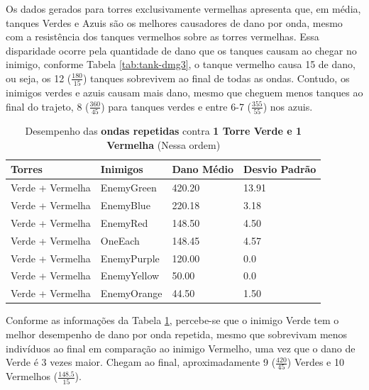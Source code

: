 Os dados gerados para torres exclusivamente vermelhas apresenta que, em média,  tanques Verdes e Azuis são os melhores causadores de dano por onda, mesmo com a resistência dos tanques vermelhos sobre as torres vermelhas. Essa disparidade ocorre pela quantidade de dano que os tanques causam ao chegar no inimigo, conforme Tabela \ref{tab:tank-dmg3}, o tanque vermelho causa 15 de dano, ou seja, os 12 ($\frac{180}{15}$) tanques sobrevivem ao final de todas as ondas. Contudo, os inimigos verdes e azuis causam mais dano, mesmo que cheguem menos tanques ao final do trajeto, 8 ($\frac{360}{45}$) para tanques verdes e entre 6-7 ($\frac{355}{55}$) nos azuis. 

\begin{table}
\caption{Desempenho das \textbf{ondas repetidas} contra \textbf{1 Torre Verde e 1 Vermelha} (Nessa ordem)}
\begin{tabular}{l|l|ll}
Torres           & Inimigos & Dano Médio & Desvio Padrão \\ \hline
Verde + Vermelha & EnemyGreen    & 420.20     & 13.91         \\
Verde + Vermelha & EnemyBlue     & 220.18     & 3.18          \\
Verde + Vermelha & EnemyRed      & 148.50     & 4.50          \\
Verde + Vermelha & OneEach       & 148.45     & 4.57          \\
Verde + Vermelha & EnemyPurple   & 120.00     & 0.0           \\
Verde + Vermelha & EnemyYellow   & 50.00      & 0.0           \\
Verde + Vermelha & EnemyOrange   & 44.50      & 1.50          
\end{tabular}
\label{tab:greenred}
\end{table}

\pagebreak

Conforme as informações da Tabela \ref{tab:greenred}, percebe-se que o inimigo Verde tem o melhor desempenho de dano por onda repetida, mesmo que sobrevivam menos indivíduos ao final em comparação ao inimigo Vermelho, uma vez que o dano de Verde é 3 vezes maior. Chegam ao final, aproximadamente 9 ($\frac{420}{45}$) Verdes e 10 Vermelhos ($\frac{148.5}{15}$). 

